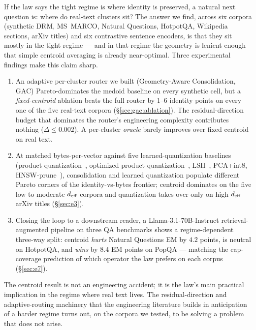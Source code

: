 If the law says the tight regime is where identity is preserved, a
natural next question is: where do real-text clusters sit? The
answer we find, across six corpora (synthetic DRM, MS~MARCO, Natural
Questions, HotpotQA, Wikipedia sections, arXiv titles) and six
contrastive sentence encoders, is that they sit mostly in the tight
regime --- and in that regime the geometry is lenient enough that
simple centroid averaging is already near-optimal. Three
experimental findings make this claim sharp.

\begin{enumerate}[leftmargin=1.8em, itemsep=2pt]
\item An adaptive per-cluster router we built (Geometry-Aware
Consolidation, GAC) Pareto-dominates the medoid baseline on every
synthetic cell, but a \emph{fixed-centroid} ablation beats the full
router by $1$--$6$ identity points on every one of the five
real-text corpora (\S\ref{sec:gac:ablation}). The residual-direction
budget that dominates the router's engineering complexity contributes
nothing ($\Delta \leq 0.002$). A per-cluster \emph{oracle} barely
improves over fixed centroid on real text.
\item At matched bytes-per-vector against five learned-quantization
baselines (product quantization~\cite{jegouPQ2011}, optimized product
quantization~\cite{ge2013optimized}, LSH~\cite{charikarLSH2002},
PCA+int8, HNSW-prune~\cite{malkovHNSW2018}), consolidation and
learned quantization populate different Pareto corners of the
identity-vs-bytes frontier; centroid dominates on the five
low-to-moderate-${d_{\mathrm{eff}}}$ corpora and quantization takes over only on
high-${d_{\mathrm{eff}}}$ arXiv titles (\S\ref{sec:e3}).
\item Closing the loop to a downstream reader, a
Llama-3.1-70B-Instruct retrieval-augmented pipeline on three QA
benchmarks shows a regime-dependent three-way split: centroid
\emph{hurts} Natural Questions EM by $4.2$ points, is neutral on
HotpotQA, and \emph{wins} by $8.4$ EM points on PopQA --- matching
the cap-coverage prediction of which operator the law prefers on
each corpus (\S\ref{sec:e7}).
\end{enumerate}

The centroid result is not an engineering accident; it is the
law's main practical implication in the regime where real text
lives. The residual-direction and adaptive-routing machinery that
the engineering literature builds in anticipation of a harder
regime turns out, on the corpora we tested, to be solving a
problem that does not arise.

